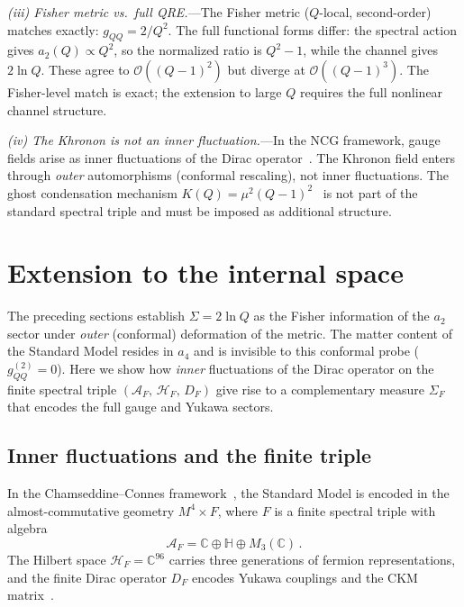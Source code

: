 \documentclass[prl,twocolumn,superscriptaddress,longbibliography]{revtex4-2}
\begin{document}
\emph{(iii) Fisher metric vs.\ full QRE.}---The
Fisher metric ($Q$-local, second-order)
matches exactly: $g_{QQ} = 2/Q^2$.
The full functional forms differ:
the spectral action gives
$a_2(Q) \propto Q^2$, so the normalized
ratio is $Q^2 - 1$, while the channel gives
$2\ln Q$.
These agree to $\mathcal{O}((Q-1)^2)$
but diverge at $\mathcal{O}((Q-1)^3)$.
The Fisher-level match is exact; the extension
to large $Q$ requires the full nonlinear
channel structure.

\emph{(iv) The Khronon is not an inner
fluctuation.}---In the NCG framework, gauge fields
arise as inner fluctuations of the Dirac
operator~\cite{CC1996,vS2024}.
The Khronon field enters through
\emph{outer} automorphisms (conformal rescaling),
not inner fluctuations.
The ghost condensation mechanism
$K(Q) = \mu^2(Q-1)^2$~\cite{BS2024} is not
part of the standard spectral triple and must
be imposed as additional structure.


\section{Extension to the internal space}
\label{sec:AF}

The preceding sections establish $\Sigma = 2\ln Q$ as the
Fisher information of the $a_2$ sector under
\emph{outer} (conformal) deformation of the
metric.
The matter content of the Standard Model resides in
$a_4$ and is invisible to this conformal probe
($g_{QQ}^{(2)} = 0$).
Here we show how \emph{inner} fluctuations of
the Dirac operator on the finite spectral triple
$(\mathcal{A}_F,\, \mathcal{H}_F,\, D_F)$
give rise to a complementary measure
$\Sigma_F$ that encodes the full gauge and
Yukawa sectors.


\subsection{Inner fluctuations and the finite triple}
\label{sec:inner}

In the Chamseddine--Connes
framework~\cite{CC1996,vS2024}, the Standard Model
is encoded in the almost-commutative geometry
$M^4 \times F$, where $F$ is a finite
spectral triple with algebra
\begin{equation}\label{eq:AF}
  \mathcal{A}_F
  = \mathbb{C} \oplus \mathbb{H}
    \oplus M_3(\mathbb{C})\,.
\end{equation}
The Hilbert space $\mathcal{H}_F
= \mathbb{C}^{96}$ carries three generations
of fermion representations, and the finite Dirac
operator $D_F$ encodes Yukawa couplings and
the CKM matrix~\cite{vS2024}.
\end{document}
